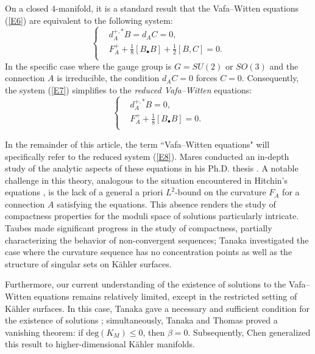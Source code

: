 \documentclass[12pt, twoside]{article}
\theoremstyle{definition}
\numberwithin{equation}{section}
\def \b {\beta}
\begin{document}
On a closed $4$-manifold, it is a standard result that the Vafa--Witten equations (\ref{E6}) are equivalent to the following system:
\begin{equation}\label{E7}
\left\{
\begin{split}
&d_{A}^{+,\ast}B=d_{A}C=0,\\
&F_{A}^{+}+\frac{1}{8}[B_{\bullet}B]+\frac{1}{2}[B,C]=0.\\
\end{split}
\right.
\end{equation}
In the specific case where the gauge group is $G=SU(2)$ or $SO(3)$ and the connection $A$ is irreducible, the condition $d_{A}C=0$ forces  $C=0$. 
Consequently, the system (\ref{E7}) simplifies to the \textit{reduced Vafa--Witten} equations:
\begin{equation}\label{E8}
\left\{ 
\begin{split}
&d^{+,\ast}_{A}B=0,\\
&F_{A}^{+}+\frac{1}{8}[B_{\bullet}B]=0.\\
\end{split}
\right.
\end{equation}

In the remainder of this article, the term ``Vafa--Witten equations" will specifically refer to the reduced system (\ref{E8}). 
Mares conducted an in-depth study of the analytic aspects of these equations in his Ph.D. thesis \cite{Mar10}. A notable challenge in this theory, analogous to the situation encountered in Hitchin's equations \cite{Hit87},  is the lack of a general a priori $L^{2}$-bound on the curvature $F_{A}$ for a connection $A$ satisfying the equations. This absence renders the study of compactness properties for the moduli space of solutions particularly intricate. Taubes \cite{Tau13,Tau14,Tau17} made significant progress in the study of compactness, partially characterizing the behavior of non-convergent sequences; Tanaka \cite{Tan15,Tan19} investigated the case where the curvature sequence has no concentration points as well as the structure of singular sets on Kähler surfaces.

Furthermore, our current understanding of the existence of solutions to the Vafa--Witten equations remains relatively limited, except in the restricted setting of Kähler surfaces. In this case, Tanaka gave a necessary and sufficient condition for the existence of solutions \cite{Tan15}; simultaneously, Tanaka and Thomas \cite{TT20} proved a vanishing theorem: if $\mathrm{deg}(K_M)\leq 0$, then $\b=0$. Subsequently, Chen \cite{Che24} generalized this result to higher-dimensional Kähler manifolds.
\end{document}
